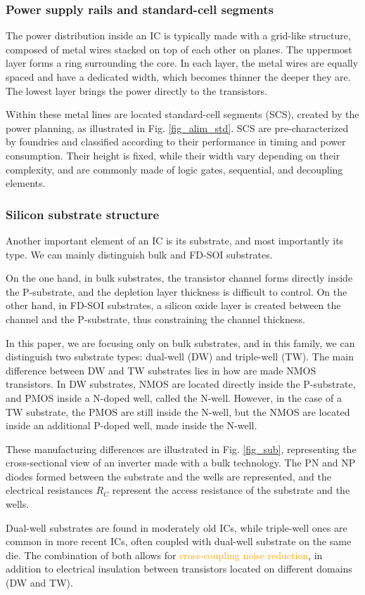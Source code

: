 \subsubsection{Power supply rails and standard-cell segments}

The power distribution inside an IC is typically made with a grid-like structure, composed of metal wires stacked on top of each other on planes.
The uppermost layer forms a ring surrounding the core.
In each layer, the metal wires are equally spaced and have a dedicated width, which becomes thinner the deeper they are.
The lowest layer brings the power directly to the transistors.

Within these metal lines are located standard-cell segments (SCS), created by the power planning, as illustrated in Fig. \ref{fig_alim_std}.
SCS are pre-characterized by foundries and classified according to their performance in timing and power consumption.
Their height is fixed, while their width vary depending on their complexity, and are commonly made of logic gates, sequential, and decoupling elements.

\subsubsection{Silicon substrate structure}
Another important element of an IC is its substrate, and most importantly its type.
We can mainly distinguish bulk and FD-SOI substrates.

On the one hand, in bulk substrates, the transistor channel forms directly inside the P-substrate, and the depletion layer thickness is difficult to control.
On the other hand, in FD-SOI substrates, a silicon oxide layer is created between the channel and the P-substrate, thus constraining the channel thickness.

In this paper, we are focusing only on bulk substrates, and in this family, we can distinguish two substrate types: dual-well (DW) and triple-well (TW).
The main difference between DW and TW substrates lies in how are made NMOS transistors.
In DW substrates, NMOS are located directly inside the P-substrate, and PMOS inside a N-doped well, called the N-well.
However, in the case of a TW substrate, the PMOS are still inside the N-well, but the NMOS are located inside an additional P-doped well, made inside the N-well.

These manufacturing differences are illustrated in Fig. \ref{fig_sub}, representing the cross-sectional view of an inverter made with a bulk technology.
The PN and NP diodes formed between the substrate and the wells are represented, and the electrical resistances $R_C$ represent the access resistance of the substrate and the wells.

Dual-well substrates are found in moderately old ICs, while triple-well ones are common in more recent ICs, often coupled with dual-well substrate on the same die.
The combination of both allows for \textcolor{orange}{cross-coupling noise reduction}, in addition to electrical insulation between transistors located on different domains (DW and TW).



